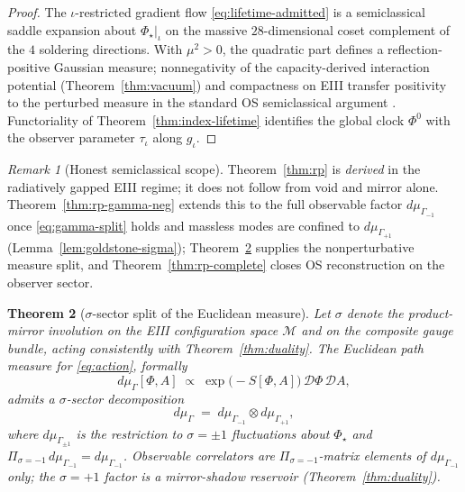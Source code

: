 \documentclass[aps,prd,onecolumn,amsmath,amssymb,nofootinbib,11pt]{revtex4-2}
\numberwithin{equation}{section}
\theoremstyle{plain}
\newtheorem{theorem}{Theorem}[section]
\theoremstyle{definition}
\theoremstyle{remark}
\newtheorem{remark}[theorem]{Remark}
\newcommand{\orderparam}{\Phi}
\begin{document}
\begin{proof}
The $\iota$-restricted gradient flow \eqref{eq:lifetime-admitted} is a
semiclassical saddle expansion about $\orderparam_\star|_\iota$ on the massive
$28$-dimensional coset complement of the $4$ soldering directions. With
$\mu^2>0$, the quadratic part defines a reflection-positive Gaussian measure;
nonnegativity of the capacity-derived interaction potential
(Theorem~\ref{thm:vacuum}) and compactness on EIII transfer positivity to the
perturbed measure in the standard OS semiclassical argument
\cite{GlimmJaffe1987,OsterwalderSchrader1973}. Functoriality of
Theorem~\ref{thm:index-lifetime} identifies the global clock
$\orderparam^0$ with the observer parameter $\tau_\iota$ along $g_\iota$.
\end{proof}

\begin{remark}[Honest semiclassical scope]
Theorem~\ref{thm:rp} is \emph{derived} in the radiatively gapped EIII regime;
it does not follow from void and mirror alone. Theorem~\ref{thm:rp-gamma-neg}
extends this to the full observable factor $d\mu_{\Gamma_{-1}}$ once
\eqref{eq:gamma-split} holds and massless modes are confined to
$d\mu_{\Gamma_{+1}}$ (Lemma~\ref{lem:goldstone-sigma}); Theorem~\ref{thm:sigma-measure}
supplies the nonperturbative measure split, and Theorem~\ref{thm:rp-complete}
closes OS reconstruction on the observer sector.
\end{remark}

\begin{theorem}[$\sigma$-sector split of the Euclidean measure]
\label{thm:sigma-measure}
Let $\sigma$ denote the product-mirror involution on the EIII configuration
space $\mathcal{M}$ and on the composite gauge bundle, acting consistently with
Theorem~\ref{thm:duality}. The Euclidean path measure for \eqref{eq:action},
formally
\begin{equation}\label{eq:gamma-full}
  d\mu_\Gamma[\orderparam,A]
  \;\propto\;
  \exp\!\bigl(-S[\orderparam,A]\bigr)\,\mathcal{D}\orderparam\,\mathcal{D}A,
\end{equation}
admits a $\sigma$-sector decomposition
\begin{equation}\label{eq:gamma-split}
  d\mu_\Gamma
  \;=\;
  d\mu_{\Gamma_{-1}}\otimes d\mu_{\Gamma_{+1}},
\end{equation}
where $d\mu_{\Gamma_{\pm1}}$ is the restriction to $\sigma=\pm1$
fluctuations about $\orderparam_\star$ and
$\Pi_{\sigma=-1}\,d\mu_{\Gamma_{-1}}=d\mu_{\Gamma_{-1}}$.
Observable correlators are $\Pi_{\sigma=-1}$-matrix elements of
$d\mu_{\Gamma_{-1}}$ only; the $\sigma=+1$ factor is a mirror-shadow
reservoir (Theorem~\ref{thm:duality}).
\end{theorem}
\end{document}
